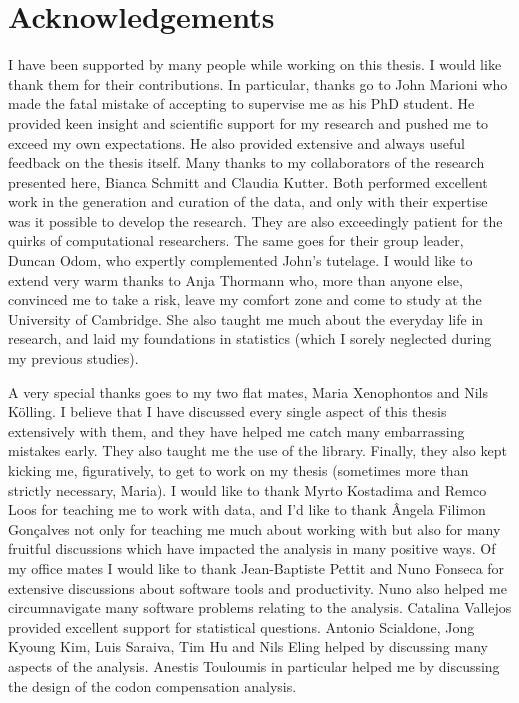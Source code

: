 \clearpage \chapter*{Acknowledgements}

I have been supported by many people while working on this thesis. I would like
thank them for their contributions. In particular, thanks go to John Marioni who
made the fatal mistake of accepting to supervise me as his PhD student. He
provided keen insight and scientific support for my research and pushed me to
exceed my own expectations. He also provided extensive and always useful
feedback on the thesis itself. Many thanks to my collaborators of the research
presented here, Bianca Schmitt and Claudia Kutter. Both performed excellent work
in the generation and curation of the data, and only with their expertise was it
possible to develop the research. They are also exceedingly patient for the
quirks of computational researchers. The same goes for their group leader,
Duncan Odom, who expertly complemented John’s tutelage. I would like to extend
very warm thanks to Anja Thormann who, more than anyone else, convinced me to
take a risk, leave my comfort zone and come to study at the University of
Cambridge. She also taught me much about the everyday life in research, and laid
my foundations in statistics (which I sorely neglected during my previous
studies).

A very special thanks goes to my two flat mates, Maria Xenophontos and Nils
Kölling. I believe that I have discussed every single aspect of this thesis
extensively with them, and they have helped me catch many embarrassing mistakes
early. They also taught me the use of the  library. Finally, they
also kept kicking me, figuratively, to get to work on my thesis (sometimes more
than strictly necessary, Maria). I would like to thank Myrto Kostadima and Remco
Loos for teaching me to work with  data, and I’d like to thank
Ângela Filimon Gonçalves not only for teaching me much about working with
 but also for many fruitful discussions which have impacted the
analysis in many positive ways. Of my office mates I would like to thank
Jean-Baptiste Pettit and Nuno Fonseca for extensive discussions about software
tools and productivity. Nuno also helped me circumnavigate many software
problems relating to the  analysis. Catalina Vallejos provided
excellent support for statistical questions. Antonio Scialdone, Jong Kyoung Kim,
Luis Saraiva, Tim Hu and Nils Eling helped by discussing many aspects of the
analysis. Anestis Touloumis in particular helped me by discussing the design of
the codon compensation analysis.

